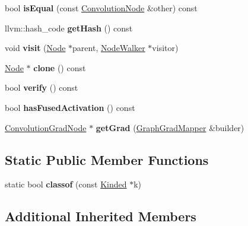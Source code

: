 \begin{DoxyCompactItemize}
bool {\bfseries is\+Equal} (const \hyperlink{classglow_1_1_convolution_node}{Convolution\+Node} \&other) const
\item 
\mbox{\label{classglow_1_1_convolution_node_acc5400571d8a762a27361744d115540d}} 
llvm\+::hash\+\_\+code {\bfseries get\+Hash} () const
\item 
\mbox{\label{classglow_1_1_convolution_node_acd8256460c2560156c36b62aba2b2637}} 
void {\bfseries visit} (\hyperlink{classglow_1_1_node}{Node} $\ast$parent, \hyperlink{classglow_1_1_node_walker}{Node\+Walker} $\ast$visitor)
\item 
\mbox{\label{classglow_1_1_convolution_node_a777fd3fbe4f213c65679c1c447756988}} 
\hyperlink{classglow_1_1_node}{Node} $\ast$ {\bfseries clone} () const
\item 
\mbox{\label{classglow_1_1_convolution_node_a950e7fdec5f328d896f69a2d28c66571}} 
bool {\bfseries verify} () const
\item 
\mbox{\label{classglow_1_1_convolution_node_a133e649735382b2671d1ef382735dfdb}} 
bool {\bfseries has\+Fused\+Activation} () const
\item 
\mbox{\label{classglow_1_1_convolution_node_ab6d88e0ca778a2592a0cbe434c9bac64}} 
\hyperlink{classglow_1_1_convolution_grad_node}{Convolution\+Grad\+Node} $\ast$ {\bfseries get\+Grad} (\hyperlink{classglow_1_1_graph_grad_mapper}{Graph\+Grad\+Mapper} \&builder)
\end{DoxyCompactItemize}
\subsection*{Static Public Member Functions}
\begin{DoxyCompactItemize}
\item 
\mbox{\label{classglow_1_1_convolution_node_a3d244167cd90de4ac6d50f83241da1af}} 
static bool {\bfseries classof} (const \hyperlink{classglow_1_1_kinded}{Kinded} $\ast$k)
\end{DoxyCompactItemize}
\subsection*{Additional Inherited Members}


